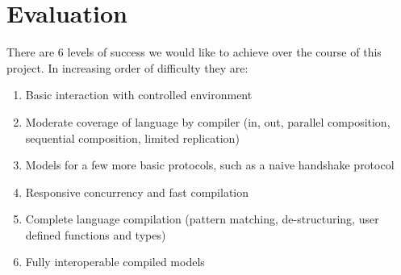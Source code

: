 \section{Evaluation}

There are 6 levels of success we would like to achieve over the course of this project. In increasing order of difficulty they are:
\begin{enumerate}
    \item Basic interaction with controlled environment
    \item Moderate coverage of language by compiler (in, out, parallel composition, sequential composition, limited replication) 
    \item Models for a few more basic protocols, such as a naive handshake protocol
    \item Responsive concurrency and fast compilation
    \item Complete language compilation (pattern matching, de-structuring, user defined functions and types)
    \item Fully interoperable compiled models
\end{enumerate}
